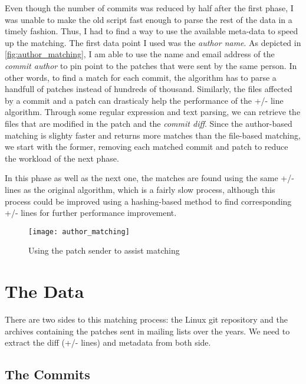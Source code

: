 Even though the number of commits was reduced by half after the first phase, I was unable to make the old script fast enough to parse the rest of the data in a timely fashion. Thus, I had to find a way to use the available meta-data to speed up the matching. The first data point I used was the \textit{author name}. As depicted in \autoref{fig:author_matching}, I am able to use the name and email address of the \textit{commit author} to pin point to the patches that were sent by the same person. In other words, to find a match for each commit, the algorithm has to parse a handfull of patches instead of hundreds of thousand. Similarly, the files affected by a commit and a patch can drasticaly help the performance of the +/- line algorithm. Through some regular expression and text parsing, we can retrieve the files that are modified in the patch and the \textit{commit diff}. Since the author-based matching is slighty faster and returns more matches than the file-based matching, we start with the former, removing each matched commit and patch to reduce the workload of the next phase.

In this phase as well as the next one, the matches are found using the same +/- lines as the original algorithm, which is a fairly slow process, although this process could be improved using a hashing-based method to find corresponding +/- lines for further performance improvement. 



\begin{figure}[htb]
\centering
\texttt{[image: author\_matching]}
\caption{Using the patch sender to assist matching}
\label{fig:author_matching}
\end{figure}


\section{The Data}

There are two sides to this matching process: the Linux git repository and the archives containing the patches sent in mailing lists over the years. We need to extract the diff (+/- lines) and metadata from both side. 



\subsection{The Commits}





